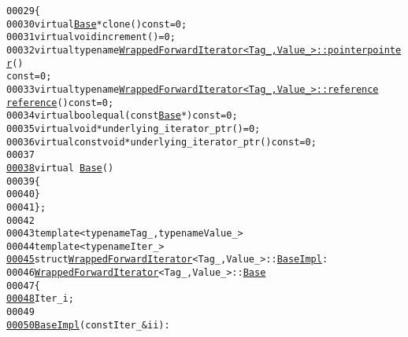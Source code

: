 \begin{footnotesize}
\begin{alltt}
00029     \{
00030         \textcolor{keyword}{virtual} \hyperlink{structeos_1_1WrappedForwardIterator_1_1Base}{Base} * clone() \textcolor{keyword}{const} = 0;
00031         \textcolor{keyword}{virtual} \textcolor{keywordtype}{void} increment() = 0;
00032         \textcolor{keyword}{virtual} \textcolor{keyword}{typename} \hyperlink{classeos_1_1WrappedForwardIterator}{WrappedForwardIterator<Tag_, Value_>::pointer} \hyperlink{classeos_1_1WrappedForwardIterator_addb7c63e8b8d4be0a65ded32a4cb7cb9}{pointer}() 
      \textcolor{keyword}{const} = 0;
00033         \textcolor{keyword}{virtual} \textcolor{keyword}{typename} \hyperlink{classeos_1_1WrappedForwardIterator}{WrappedForwardIterator<Tag_, Value_>::reference} 
      \hyperlink{classeos_1_1WrappedForwardIterator_ac7ba4ace12142ac73d97df5d555a4c18}{reference}() \textcolor{keyword}{const} = 0;
00034         \textcolor{keyword}{virtual} \textcolor{keywordtype}{bool} equal(\textcolor{keyword}{const} \hyperlink{structeos_1_1WrappedForwardIterator_1_1Base}{Base} *) \textcolor{keyword}{const} = 0;
00035         \textcolor{keyword}{virtual} \textcolor{keywordtype}{void} * underlying\_iterator\_ptr() = 0;
00036         \textcolor{keyword}{virtual} \textcolor{keyword}{const} \textcolor{keywordtype}{void} * underlying\_iterator\_ptr() \textcolor{keyword}{const} = 0;
00037 
\hypertarget{wrapped__forward__iterator-impl_8hh_source_l00038}{}\hyperlink{structeos_1_1WrappedForwardIterator_1_1Base_a4d6dc901016516de2f269abb38446c22}{00038}         \textcolor{keyword}{virtual} ~\hyperlink{structeos_1_1WrappedForwardIterator_1_1Base}{Base}()
00039         \{
00040         \}
00041     \};
00042 
00043     \textcolor{keyword}{template} <\textcolor{keyword}{typename} Tag\_, \textcolor{keyword}{typename} Value\_>
00044     \textcolor{keyword}{template} <\textcolor{keyword}{typename} Iter\_>
\hypertarget{wrapped__forward__iterator-impl_8hh_source_l00045}{}\hyperlink{structeos_1_1WrappedForwardIterator_1_1BaseImpl}{00045}     \textcolor{keyword}{struct }\hyperlink{classeos_1_1WrappedForwardIterator}{WrappedForwardIterator}<Tag\_, Value\_>::\hyperlink{structeos_1_1WrappedForwardIterator_1_1BaseImpl}{BaseImpl} :
00046         \hyperlink{classeos_1_1WrappedForwardIterator}{WrappedForwardIterator}<Tag\_, Value\_>::\hyperlink{structeos_1_1WrappedForwardIterator_1_1Base}{Base}
00047     \{
\hypertarget{wrapped__forward__iterator-impl_8hh_source_l00048}{}\hyperlink{structeos_1_1WrappedForwardIterator_1_1BaseImpl_a1cb305ebb3b36e941fc5f74b78e4b8a1}{00048}         Iter\_ i;
00049 
\hypertarget{wrapped__forward__iterator-impl_8hh_source_l00050}{}\hyperlink{structeos_1_1WrappedForwardIterator_1_1BaseImpl_ace18b4460fe774ada155046312de5ad6}{00050}         \hyperlink{structeos_1_1WrappedForwardIterator_1_1BaseImpl}{BaseImpl}(\textcolor{keyword}{const} Iter\_ & ii) :

\end{alltt}
\end{footnotesize}
